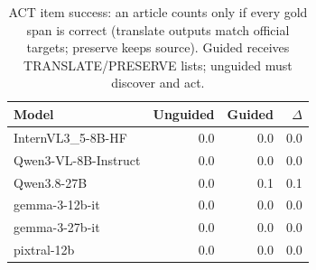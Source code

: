 \begin{table}[t]\centering\small
\caption{ACT item success: an article counts only if every gold span is correct (translate outputs match official targets; preserve keeps source). Guided receives TRANSLATE/PRESERVE lists; unguided must discover and act.}
\label{tab:news-act-item}
\begin{tabular}{l r r r}\toprule
Model & Unguided & Guided & $\Delta$ \\
\midrule
InternVL3_5-8B-HF & 0.0 & 0.0 & 0.0 \\
Qwen3-VL-8B-Instruct & 0.0 & 0.0 & 0.0 \\
Qwen3.8-27B & 0.0 & 0.1 & 0.1 \\
gemma-3-12b-it & 0.0 & 0.0 & 0.0 \\
gemma-3-27b-it & 0.0 & 0.0 & 0.0 \\
pixtral-12b & 0.0 & 0.0 & 0.0 \\
\bottomrule\end{tabular}\end{table}
